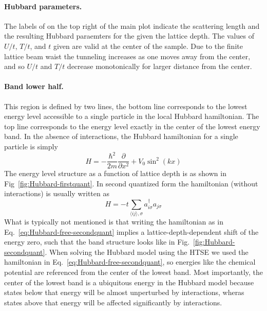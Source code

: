 \documentclass[11pt,letter]{article}
\begin{document}
\paragraph{Hubbard parameters.}  The labels of on the top right of the main
plot indicate the scattering length and the resulting Hubbard paraemters for
the given the lattice depth.  The values of $U/t$, $T/t$, and $t$ given are
valid at the center of the sample.  Due to the finite lattice beam waist the
tunneling increases as one moves away from the center, and so $U/t$ and $T/t$
decrease monotonically for larger distance from the center.  

\paragraph{Band lower half.}  This region is defined by two lines, the bottom
line corresponds to the lowest energy level accessible to a single particle in
the local  Hubbard hamiltonian.   The top line corresponds to the energy level
exactly in the center of the lowest energy band.      In the absence of
interactions, the Hubbard hamiltonian for a single particle is simply 
\begin{equation} 
  H  = -\frac{\hbar^{2}}{2m} \frac{ \partial }{ \partial x^{2} } +  
       V_{0} \sin^{2}(kx)  
\end{equation}   
The energy level structure as a function of lattice depth is as shown in
Fig~\ref{fig:Hubbard-firstquant}.   In second quantized form the hamiltonian
(without interactions) is usually written as  
\begin{equation} 
  H  = -t \sum_{ \langle ij \rangle, \sigma } a_{i\sigma}^{\dagger} a_{j\sigma} 
  \label{eq:Hubbard-free-secondquant}
\end{equation}  
What is typically not mentioned is that writing the hamiltonian as in
Eq.~\ref{eq:Hubbard-free-secondquant} implies a lattice-depth-dependent  shift
of the energy zero, such that the band structure looks like in
Fig.~\ref{fig:Hubbard-secondquant}.   When solving the Hubbard model using the
HTSE we used the hamiltonian in Eq.~\ref{eq:Hubbard-free-secondquant}, so
energies like the chemical potential are referenced from the center of the
lowest band.    Most importantly, the center of the lowest band is a ubiquitous
energy in the Hubbard model because states below that energy will be almost
unperturbed by interactions, wheras states above that energy will be affected
significantly by interactions. 
\end{document}
